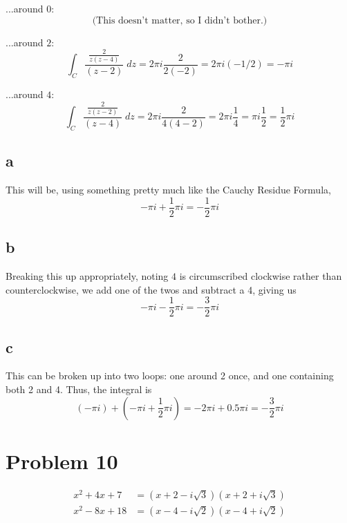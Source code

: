 \documentclass{article}
\theoremstyle{definition}
\newcommand{\p}[1]{\left(#1\right)}
\begin{document}
...around $0$:
\[
\text{(This doesn't matter, so I didn't bother.)}
\]

...around $2$:
\[
\int_C \frac{\frac{2}{z(z-4)}}{(z-2)} \;dz 
= 2 \pi i \frac{2}{2(-2)} 
= 2 \pi i (-1/2)
= - \pi i
\]

...around $4$:
\[
\int_C \frac{\frac{2}{z(z-2)}}{(z-4)} \;dz
= 2 \pi i \frac{2}{4(4-2)} 
= 2 \pi i \frac{1}{4} 
= \pi i \frac{1}{2}
= \frac{1}{2}\pi i
\]

\subsection{a}
This will be, using something pretty much like the Cauchy Residue Formula,
\[ -\pi i + \frac{1}{2}\pi i = -\frac{1}{2} \pi i\]

\subsection{b}
Breaking this up appropriately, noting $4$ is circumscribed clockwise rather 
than counterclockwise, we add one of the twos and subtract a 4, giving us
\[ -\pi i - \frac{1}{2} \pi i = -\frac{3}{2} \pi i \]

\subsection{c}
This can be broken up into two loops: one around 2 once, and one containing both 2
and 4. Thus, the integral is
\[ (-\pi i) + \p{-\pi i + \frac{1}{2} \pi i} 
= -2 \pi i + 0.5 \pi i 
= -\frac{3}{2} \pi i \]

\section{Problem 10}

\begin{align*}
x^2 + 4x + 7 &= (x+2-i\sqrt{3})(x+2+i\sqrt{3}) \\
x^2 - 8x + 18 &= (x-4-i \sqrt{2}) (x-4+i \sqrt{2})
\end{align*}
\end{document}
